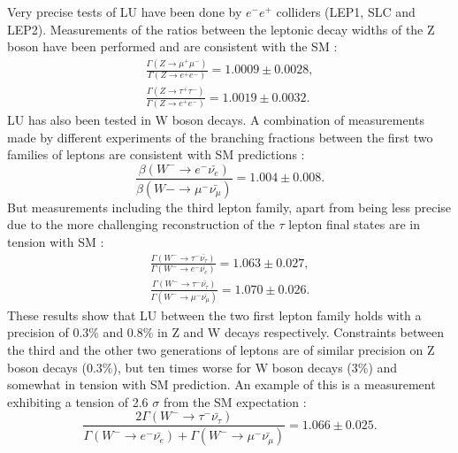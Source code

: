 Very precise tests of LU have been done by $e^-e^+$ colliders (LEP1, SLC and LEP2). Measurements of the ratios between the leptonic decay widths of the Z boson have been performed and are consistent with the SM \cite{ALEPH:2005ab}:
\begin{align}
	\frac{\Gamma(Z\to\mu^+\mu^-)}{\Gamma(Z\to e^+e^-)}=1.0009\pm 0.0028,
	\\
	\frac{\Gamma(Z\to\tau^+\tau^-)}{\Gamma(Z\to e^+e^-)}=1.0019\pm 0.0032.
\end{align}
LU has also been tested in W boson decays. A combination of measurements made by different experiments of the branching fractions between the first two families of leptons are consistent with SM predictions \cite{Pich:2013lsa}:
\begin{equation}
\frac{\beta(W^-\to e^-\bar{\nu_e})}{\beta(W-\to \mu^-\bar{\nu_\mu})}=1.004\pm 0.008.
\end{equation}
But measurements including the third lepton family, apart from being less precise due to the more challenging reconstruction of the $\tau$ lepton final states are in tension with SM \cite{Schael:2013ita}:
\begin{align}
\frac{\Gamma(W^-\to\tau^-\bar{\nu_\tau})}{\Gamma(W^-\to e^-\bar{\nu_e})}=1.063\pm 0.027,
\\
\frac{\Gamma(W^-\to\tau^-\bar{\nu_\tau})}{\Gamma(W^-\to \mu^-\bar{\nu_\mu})}=1.070\pm 0.026.
\end{align}
These results show that LU between the two first lepton family holds with a precision of 0.3\% and 0.8\% in Z and W decays respectively. Constraints between the third and the other two generations of leptons are of similar precision on Z boson decays (0.3\%), but ten times worse for W boson decays (3\%) and somewhat in tension with SM prediction. An example of this is a measurement exhibiting a tension of 2.6 $\sigma$ from the SM expectation \cite{Schael:2013ita}:
\begin{equation}
	\frac{2\Gamma(W^-\to\tau^-\bar{\nu_\tau})}{\Gamma(W^-\to e^-\bar{\nu_e})+\Gamma(W^-\to \mu^-\bar{\nu_\mu})}=1.066\pm 0.025.
\end{equation}  


